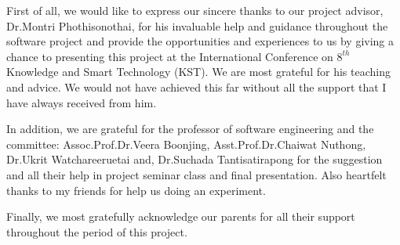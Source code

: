\cleardoublepage


\begin{acknowledgements}

\hspace{1.5cm}First of all, we  would like to express our sincere thanks to our project advisor, Dr.Montri Phothisonothai, for his invaluable help and guidance throughout the software project and  provide the opportunities and experiences to us by giving a chance to presenting this project at the International Conference on $8^{th}$ Knowledge and Smart Technology (KST). We are most grateful for his teaching and advice. We would not have achieved this far without all the support that I have always received from him.

\hspace{1.5cm}In addition, we are grateful for the professor of software engineering and the committee: 
Assoc.Prof.Dr.Veera Boonjing, 
Asst.Prof.Dr.Chaiwat Nuthong, 
Dr.Ukrit Watchareeruetai and,  
Dr.Suchada Tantisatirapong
for the suggestion and all their help in project seminar class and final presentation. 
Also heartfelt thanks to my friends for help us doing an experiment.

\hspace{1.5cm}Finally, we most gratefully acknowledge our parents for all their support throughout the period of this project.

\end{acknowledgements}